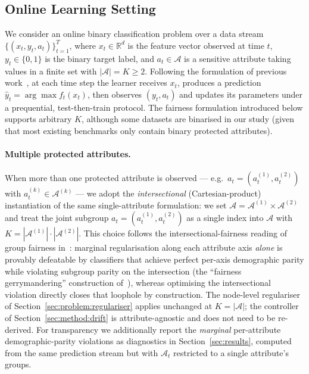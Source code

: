 \documentclass[sigconf,anonymous,review]{acmart}
\begin{document}
\subsection{Online Learning Setting}
\label{sec:problem:online}
We consider an online binary classification problem over a data stream $\{(x_t, y_t, a_t)\}_{t=1}^{T}$, where $x_t \in \mathbb{R}^d$ is the feature vector observed at time $t$,
$y_t \in \{0,1\}$ is the binary target label, and $a_t \in \mathcal{A}$ is a sensitive attribute taking values in a finite set with $|\mathcal{A}|=K \ge 2$. Following the
formulation of previous work~\cite{chowdhury2024enhancing,ijcai2019p205}, at each time step the learner receives $x_t$, produces a prediction
$\hat{y}_t = \arg\max f_t(x_t)$, then observes $(y_t, a_t)$ and updates its parameters under a prequential, test-then-train protocol. The fairness formulation introduced below
supports arbitrary $K$, although some datasets are binarised in our study (given that most existing benchmarks only contain binary protected attributes).

\paragraph{Multiple protected attributes.}
\label{sec:problem:multi-attr}
When more than one protected attribute is observed --- e.g.\ $a_t = (a^{(1)}_t, a^{(2)}_t)$ with $a^{(k)}_t \in \mathcal{A}^{(k)}$ --- we adopt the
\emph{intersectional} (Cartesian-product) instantiation of the same single-attribute formulation: we set $\mathcal{A} = \mathcal{A}^{(1)} \times \mathcal{A}^{(2)}$ and treat
the joint subgroup $a_t = (a^{(1)}_t, a^{(2)}_t)$ as a single index into $\mathcal{A}$ with $K = |\mathcal{A}^{(1)}| \cdot |\mathcal{A}^{(2)}|$. This choice follows the
intersectional-fairness reading of group fairness in~\cite{kearns2018gerrymandering,foulds2020intersectional}: marginal regularisation along each attribute axis
\emph{alone} is provably defeatable by classifiers that achieve perfect per-axis demographic parity while violating subgroup parity on the intersection (the ``fairness
gerrymandering'' construction of~\cite{kearns2018gerrymandering}), whereas optimising the intersectional violation directly closes that loophole by construction. The
node-level regulariser of Section~\ref{sec:problem:regulariser} applies unchanged at $K = |\mathcal{A}|$; the controller of Section~\ref{sec:method:drift} is
attribute-agnostic and does not need to be re-derived. For transparency we additionally report the \emph{marginal} per-attribute demographic-parity violations
as diagnostics in Section~\ref{sec:results}, computed from the same prediction stream but with $\mathcal{A}_t$ restricted to a single attribute's groups.
\end{document}
